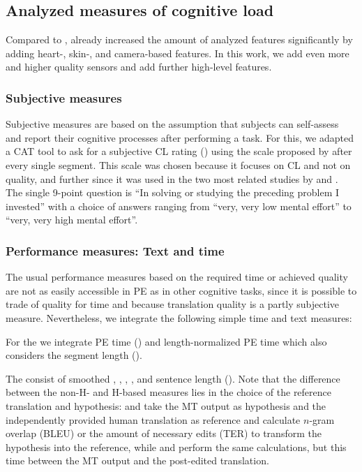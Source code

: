 \documentclass[output=paper]{langsci/langscibook}
\begin{document}
\subsection{Analyzed measures of cognitive load}
\label{sec:CLmeasures}
Compared to \citet{vieira2016measures}, \citet{herbig2019mt} already increased the amount of analyzed features significantly by adding heart-, skin-, and camera-based features. In this work, we add even more and higher quality sensors and add further high-level features.

\subsubsection{Subjective measures}
Subjective measures are based on the assumption that subjects can self-assess and report their cognitive processes after performing a task. For this, we adapted a CAT tool to ask for a subjective CL rating (\subjCL{}) using the scale proposed by \citet{paas1994instructional} after every single segment. This scale was chosen because it focuses on CL and not on quality, %
and further since it was used in the two most related studies by \citet{vieira2016measures} and \citet{herbig2019mt}. %
The single 9-point question is ``In solving or studying the preceding problem I invested'' with a choice of answers ranging from ``very, very low mental effort'' to ``very, very high mental effort''.

\subsubsection{Performance measures: Text and time}
The usual performance measures based on the required time or achieved quality are not as easily accessible in PE as in other cognitive tasks, since it is possible to trade of quality for time and because translation quality is a partly subjective measure.  Nevertheless, we integrate the following simple time and text measures:

For the  we integrate PE time (\petime{}) and length-normalized PE time which also considers the segment length (\lnpetime{}).

The  consist of smoothed \bleu{}, \hbleu{} \citep{Lin:2004:AEM:1218955.1219032}, \ter{}, \hter{} \citep{TERp:2009}, and sentence length (\sentencelength{}).
Note that the difference between the non-H- and H-based measures lies in the choice of the reference translation and hypothesis: \bleu{} and \ter{} take the MT output as hypothesis and the independently provided human translation as reference and calculate $n$-gram overlap (BLEU) or the amount of necessary edits (TER) to transform the hypothesis into the reference, while \hbleu{} and \hter{} perform the same calculations, but this time between the MT output and the post-edited translation.
\end{document}
